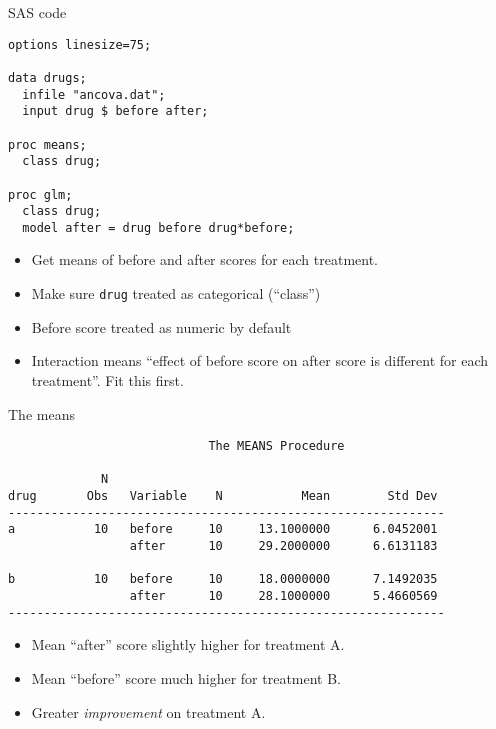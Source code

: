 \documentclass[pdf]{prosper}
\begin{document}
\begin{slide}{SAS code}

\begin{verbatim}
options linesize=75;

data drugs;
  infile "ancova.dat";
  input drug $ before after;

proc means;
  class drug;

proc glm;
  class drug;
  model after = drug before drug*before;
\end{verbatim}

  \begin{itemize}
  \item Get means of before and after scores for each treatment.
  \item Make sure \verb-drug- treated as categorical (``class'')
  \item Before score treated as numeric by default
  \item Interaction means ``effect of before score on after score is different for each treatment''. Fit this first.
  \end{itemize}
  
\end{slide}

\begin{slide}{The means}
{\scriptsize
\begin{verbatim}
                            The MEANS Procedure

             N
drug       Obs   Variable    N           Mean        Std Dev 
-------------------------------------------------------------
a           10   before     10     13.1000000      6.0452001 
                 after      10     29.2000000      6.6131183 

b           10   before     10     18.0000000      7.1492035 
                 after      10     28.1000000      5.4660569 
-------------------------------------------------------------

\end{verbatim}
}

\begin{itemize}
\item Mean ``after'' score slightly higher for treatment A.
\item Mean ``before'' score much higher for treatment B.
\item Greater {\em improvement} on treatment A. 
\end{itemize}
  
\end{slide}
\end{document}
